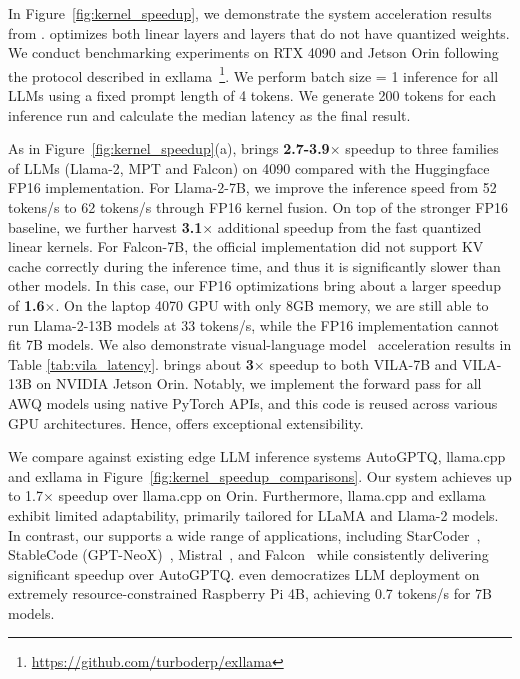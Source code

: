  In Figure~\ref{fig:kernel_speedup}, we demonstrate the system acceleration results from \system. \system optimizes both linear layers and layers that do not have quantized weights. We conduct benchmarking experiments on RTX 4090 and Jetson Orin following the protocol described in exllama~\footnote{\url{https://github.com/turboderp/exllama}}. We perform batch size = 1 inference for all LLMs using a fixed prompt length of 4 tokens. We generate 200 tokens for each inference run and calculate the median latency as the final result.

 As in Figure~\ref{fig:kernel_speedup}(a), \system brings \textbf{2.7-3.9$\times$} speedup to three families of LLMs (Llama-2, MPT and Falcon) on 4090 compared with the Huggingface FP16 implementation. For Llama-2-7B, we improve the inference speed from 52 tokens/s to 62 tokens/s through FP16 kernel fusion. On top of the stronger FP16 baseline, we further harvest \textbf{3.1$\times$} additional speedup from the fast quantized linear kernels. For Falcon-7B, the official implementation did not support KV cache correctly during the inference time, and thus it is significantly slower than other models. In this case, our FP16 optimizations bring about a larger speedup of \textbf{1.6$\times$}. On the laptop 4070 GPU with only 8GB memory, we are still able to run Llama-2-13B models at 33 tokens/s, while the FP16 implementation cannot fit 7B models. We also demonstrate visual-language model~\cite{lin2023vila} acceleration results in Table \ref{tab:vila_latency}. \system brings about \textbf{3$\times$} speedup to both VILA-7B and VILA-13B on NVIDIA Jetson Orin. Notably, we implement the forward pass for all AWQ models using native PyTorch APIs, and this code is reused across various GPU architectures. Hence, \system offers exceptional extensibility. %

We compare \system against existing edge LLM inference systems AutoGPTQ, llama.cpp and exllama in Figure~\ref{fig:kernel_speedup_comparisons}. Our system achieves up to 1.7$\times$ speedup over llama.cpp on Orin. Furthermore, llama.cpp and exllama exhibit limited adaptability, primarily tailored for LLaMA and Llama-2 models. In contrast, our \system supports a wide range of applications, including StarCoder~\cite{li2023starcoder}, StableCode (GPT-NeoX)~\cite{black2022gpt}, Mistral~\cite{jiang2023mistral}, and Falcon~\cite{penedo2023refinedweb} while consistently delivering significant speedup over AutoGPTQ. \system even democratizes LLM deployment on extremely resource-constrained Raspberry Pi 4B, achieving 0.7 tokens/s for 7B models. 

